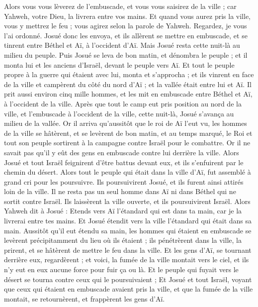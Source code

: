 \begin{multicols}{2}
Alors vous vous lèverez de l'embuscade, et vous vous saisirez de la ville ; car Yahweh, votre Dieu, la livrera entre vos mains.
Et quand vous aurez pris la ville, vous y mettrez le feu ; vous agirez selon la parole de Yahweh. Regardez, je vous l'ai ordonné.
Josué donc les envoya, et ils allèrent se mettre en embuscade, et se tinrent entre Béthel et Aï, à l'occident d'Aï. Mais Josué resta cette nuit-là au milieu du peuple.
Puis Josué se leva de bon matin, et dénombra le peuple ; et il monta lui et les anciens d'Israël, devant le peuple vers Aï.
Et tout le peuple propre à la guerre qui étaient avec lui, monta et s'approcha ; et ils vinrent en face de la ville et campèrent du côté du nord d'Aï ; et la vallée était entre lui et Aï.
Il prit aussi environ cinq mille hommes, et les mit en embuscade entre Béthel et Aï, à l'occident de la ville.
Après que tout le camp eut pris position au nord de la ville, et l'embuscade à l'occident de la ville, cette nuit-là, Josué s'avança au milieu de la vallée.
Or il arriva qu'aussitôt que le roi de Aï l'eut vu, les hommes de la ville se hâtèrent, et se levèrent de bon matin, et au temps marqué, le Roi et tout son peuple sortirent à la campagne contre Israël pour le combattre. Or il ne savait pas qu'il y eût des gens en embuscade contre lui derrière la ville.
Alors Josué et tout Israël feignirent d'être battus devant eux, et ils s'enfuirent par le chemin du désert.
Alors tout le peuple qui était dans la ville d'Aï, fut assemblé à grand cri pour les poursuivre. Ils poursuivirent Josué, et ils furent ainsi attirés loin de la ville.
Il ne resta pas un seul homme dans Aï ni dans Béthel qui ne sortit contre Israël. Ils laissèrent la ville ouverte, et ils poursuivirent Israël.
Alors Yahweh dit à Josué : Etends vers Aï l'étandard qui est dans ta main, car je la livrerai entre tes mains. Et Josué étendit vers la ville l'étandard qui était dans sa main.
Aussitôt qu'il eut étendu sa main, les hommes qui étaient en embuscade se levèrent précipitamment du lieu où ils étaient ; ils pénétrèrent dans la ville, la prirent, et se hâtèrent de mettre le feu dans la ville.
Et les gens d'Aï, se tournant derrière eux, regardèrent ; et voici, la fumée de la ville montait vers le ciel, et ils n'y eut en eux aucune force pour fuir ça ou là. Et le peuple qui fuyait vers le désert se tourna contre ceux qui le poursuivaient ;
Et Josué et tout Israël, voyant que ceux qui étaient en embuscade avaient pris la ville, et que la fumée de la ville montait, se retournèrent, et frappèrent les gens d'Aï.

\end{multicols}
